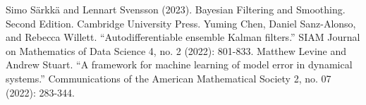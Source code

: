 \documentclass[communication]{CEDYA}
\begin{document}
\begin{abstract}




\end{abstract}


\begin{thebibliography}{99}
 Simo S\"arkk\"a and Lennart Svensson (2023).
Bayesian Filtering and Smoothing. Second
Edition. Cambridge University Press.
 Yuming Chen, Daniel Sanz-Alonso, and Rebecca Willett. ``Autodifferentiable ensemble Kalman filters.'' SIAM Journal on Mathematics of Data Science 4, no. 2 (2022): 801-833.
 Matthew Levine and Andrew Stuart. ``A framework for machine learning of model error in dynamical systems.'' Communications of the American Mathematical Society 2, no. 07 (2022): 283-344.
\end{thebibliography}

\end{document}
